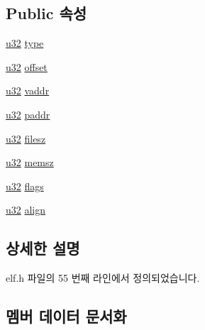 \subsection*{Public 속성}
\begin{DoxyCompactItemize}
\item 
\mbox{\hyperlink{_system_8h_a10e94b422ef0c20dcdec20d31a1f5049}{u32}} \mbox{\hyperlink{struct_e_l_f_program_header_af6f8a937522c04b854720ce9123feb39}{type}}
\item 
\mbox{\hyperlink{_system_8h_a10e94b422ef0c20dcdec20d31a1f5049}{u32}} \mbox{\hyperlink{struct_e_l_f_program_header_ad5321e73c13a67e6b8ff192718c49ef8}{offset}}
\item 
\mbox{\hyperlink{_system_8h_a10e94b422ef0c20dcdec20d31a1f5049}{u32}} \mbox{\hyperlink{struct_e_l_f_program_header_a7185e6711867b15d2d2dd04666d8838f}{vaddr}}
\item 
\mbox{\hyperlink{_system_8h_a10e94b422ef0c20dcdec20d31a1f5049}{u32}} \mbox{\hyperlink{struct_e_l_f_program_header_af64562e4f23abc28184c74b37125fa6c}{paddr}}
\item 
\mbox{\hyperlink{_system_8h_a10e94b422ef0c20dcdec20d31a1f5049}{u32}} \mbox{\hyperlink{struct_e_l_f_program_header_aa74d6e39126edabc460116b7e2693469}{filesz}}
\item 
\mbox{\hyperlink{_system_8h_a10e94b422ef0c20dcdec20d31a1f5049}{u32}} \mbox{\hyperlink{struct_e_l_f_program_header_a501661133d3a1c9f9d11cd4dd582d626}{memsz}}
\item 
\mbox{\hyperlink{_system_8h_a10e94b422ef0c20dcdec20d31a1f5049}{u32}} \mbox{\hyperlink{struct_e_l_f_program_header_a6e404410651c4610349928dc4dbe8a0f}{flags}}
\item 
\mbox{\hyperlink{_system_8h_a10e94b422ef0c20dcdec20d31a1f5049}{u32}} \mbox{\hyperlink{struct_e_l_f_program_header_a202b13684dfefe12c5d43709a3620698}{align}}
\end{DoxyCompactItemize}


\subsection{상세한 설명}


elf.\+h 파일의 55 번째 라인에서 정의되었습니다.



\subsection{멤버 데이터 문서화}
\mbox{\label{struct_e_l_f_program_header_a202b13684dfefe12c5d43709a3620698}} 
